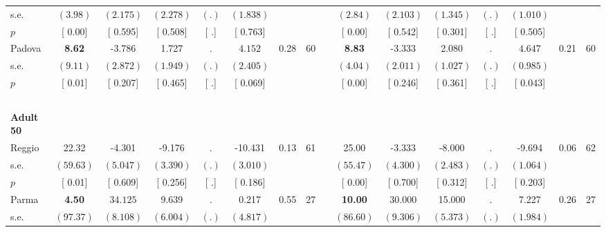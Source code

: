 \begin{longtable}{L{8em} c c c c c c c p{1em} c c c c c c c}
\quad \quad \quad \quad s.e.& $ (     3.98)$ & $ (    2.175)$ & $ (    2.278)$ & $ (        .)$ & $ (    1.838)$ & & & & $ (     2.84)$ & $ (    2.103)$ & $ (    1.345)$ & $ (        .)$ & $ (    1.010)$ & &  \\*
\quad \quad \quad \quad $ p$ & [     0.00] & [    0.595] & [    0.508] & [        .] & [    0.763] & & & & [     0.00] & [    0.542] & [    0.301] & [        .] & [    0.505] & &  \\[1em]
\quad \quad \quad Padova& \textbf{     8.62} &    -3.786 &     1.727 &         . & $ \mathbf{    4.152}$ &      0.28 &        60 & & \textbf{     8.83} &    -3.333 &     2.080 &         . & $ \mathbf{    4.647}$ &      0.21 &        60  \\*
\quad \quad \quad \quad s.e.& $ (     9.11)$ & $ (    2.872)$ & $ (    1.949)$ & $ (        .)$ & $ (    2.405)$ & & & & $ (     4.04)$ & $ (    2.011)$ & $ (    1.027)$ & $ (        .)$ & $ (    0.985)$ & &  \\*
\quad \quad \quad \quad $ p$ & [     0.01] & [    0.207] & [    0.465] & [        .] & [    0.069] & & & & [     0.00] & [    0.246] & [    0.361] & [        .] & [    0.043] & &  \\[1em]
~\\[1em]
\quad \quad \textbf{Adult 50} & & & & & & & & & & & & & & & \\* 
\quad \quad \quad Reggio& 22.32 &    -4.301 &    -9.176 &         . &   -10.431 &      0.13 &        61 & & 25.00 &    -3.333 &    -8.000 &         . &    -9.694 &      0.06 &        62  \\*
\quad \quad \quad \quad s.e.& $ (    59.63)$ & $ (    5.047)$ & $ (    3.390)$ & $ (        .)$ & $ (    3.010)$ & & & & $ (    55.47)$ & $ (    4.300)$ & $ (    2.483)$ & $ (        .)$ & $ (    1.064)$ & &  \\*
\quad \quad \quad \quad $ p$ & [     0.01] & [    0.609] & [    0.256] & [        .] & [    0.186] & & & & [     0.00] & [    0.700] & [    0.312] & [        .] & [    0.203] & &  \\[1em]
\quad \quad \quad Parma& \textbf{     4.50} & $ \mathbf{   34.125}$ &     9.639 &         . &     0.217 &      0.55 &        27 & & \textbf{    10.00} & $ \mathbf{   30.000}$ &    15.000 &         . &     7.227 &      0.26 &        27  \\*
\quad \quad \quad \quad s.e.& $ (    97.37)$ & $ (    8.108)$ & $ (    6.004)$ & $ (        .)$ & $ (    4.817)$ & & & & $ (    86.60)$ & $ (    9.306)$ & $ (    5.373)$ & $ (        .)$ & $ (    1.984)$ & &  \\*

\end{longtable}
